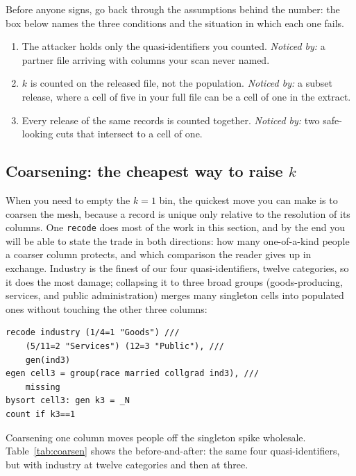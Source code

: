 Before anyone signs, go back through the assumptions behind the number: the box below names the three conditions and the situation in which each one fails.

\begin{restson}
\begin{enumerate}
\item The attacker holds only the quasi-identifiers you counted. \emph{Noticed by:} a partner file arriving with columns your scan never named.
\item $k$ is counted on the released file, not the population. \emph{Noticed by:} a subset release, where a cell of five in your full file can be a cell of one in the extract.
\item Every release of the same records is counted together. \emph{Noticed by:} two safe-looking cuts that intersect to a cell of one.
\end{enumerate}
\end{restson}

\subsection{Coarsening: the cheapest way to raise \texorpdfstring{$k$}{k}}\label{sec:coarsen}
When you need to empty the $k=1$ bin, the quickest move you can make is to coarsen the mesh, because a record is unique only relative to the resolution of its columns. One \texttt{recode} does most of the work in this section, and by the end you will be able to state the trade in both directions: how many one-of-a-kind people a coarser column protects, and which comparison the reader gives up in exchange. Industry is the finest of our four quasi-identifiers, twelve categories, so it does the most damage; collapsing it to three broad groups (goods-producing, services, and public administration) merges many singleton cells into populated ones without touching the other three columns:
\par
{\footnotesize
\begin{verbatim}
recode industry (1/4=1 "Goods") ///
    (5/11=2 "Services") (12=3 "Public"), ///
    gen(ind3)
egen cell3 = group(race married collgrad ind3), ///
    missing
bysort cell3: gen k3 = _N
count if k3==1
\end{verbatim}
}
Coarsening one column moves people off the singleton spike wholesale. Table~\ref{tab:coarsen} shows the before-and-after: the same four quasi-identifiers, but with industry at twelve categories and then at three.

